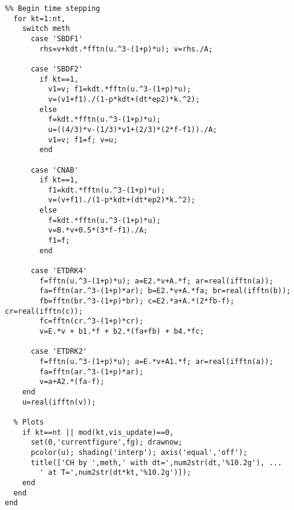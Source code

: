 \begin{verbatim}
%% Begin time stepping
  for kt=1:nt,
    switch meth
      case 'SBDF1'
        rhs=v+kdt.*fftn(u.^3-(1+p)*u); v=rhs./A;
        
      case 'SBDF2'
        if kt==1, 
          v1=v; f1=kdt.*fftn(u.^3-(1+p)*u);
          v=(v1+f1)./(1-p*kdt+(dt*ep2)*k.^2);
        else 
          f=kdt.*fftn(u.^3-(1+p)*u); 
          u=((4/3)*v-(1/3)*v1+(2/3)*(2*f-f1))./A; 
          v1=v; f1=f; v=u;
        end
        
      case 'CNAB'
        if kt==1,
          f1=kdt.*fftn(u.^3-(1+p)*u); 
          v=(v+f1)./(1-p*kdt+(dt*ep2)*k.^2);
        else
          f=kdt.*fftn(u.^3-(1+p)*u);
          v=B.*v+0.5*(3*f-f1)./A;
          f1=f; 
        end
        
      case 'ETDRK4'
        f=fftn(u.^3-(1+p)*u); a=E2.*v+A.*f; ar=real(ifftn(a));
        fa=fftn(ar.^3-(1+p)*ar); b=E2.*v+A.*fa; br=real(ifftn(b));
        fb=fftn(br.^3-(1+p)*br); c=E2.*a+A.*(2*fb-f); cr=real(ifftn(c));
        fc=fftn(cr.^3-(1+p)*cr);
        v=E.*v + b1.*f + b2.*(fa+fb) + b4.*fc;
        
      case 'ETDRK2'
        f=fftn(u.^3-(1+p)*u); a=E.*v+A1.*f; ar=real(ifftn(a));
        fa=fftn(ar.^3-(1+p)*ar); 
        v=a+A2.*(fa-f);
    end
    u=real(ifftn(v));
    
  % Plots
    if kt==nt || mod(kt,vis_update)==0,
      set(0,'currentfigure',fg); drawnow;
      pcolor(u); shading('interp'); axis('equal','off'); 
      title(['CH by ',meth,' with dt=',num2str(dt,'%10.2g'), ...
        ' at T=',num2str(dt*kt,'%10.2g')]); 
    end
  end
end
\end{verbatim}
